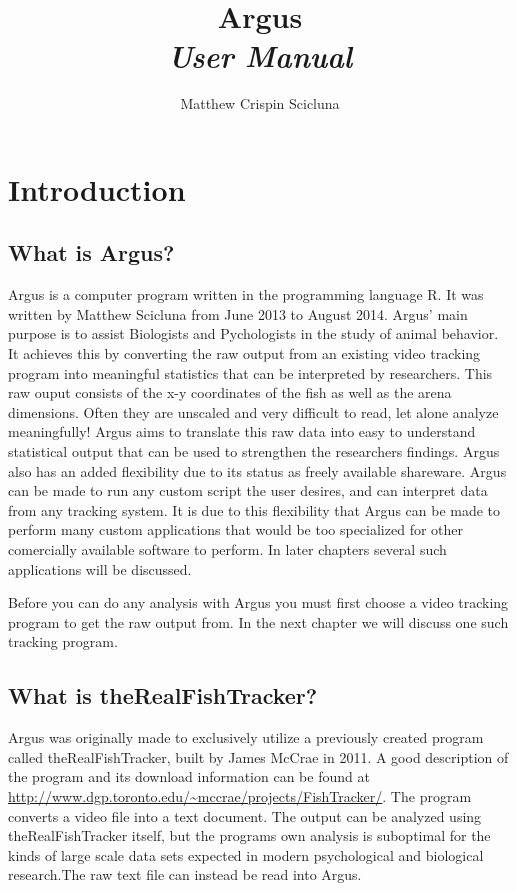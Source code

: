\documentclass[12pt,titlepage]{report}
\begin{document}
\title{\Huge{Argus} 
\\  \large\emph{User Manual}}
\author{Matthew Crispin Scicluna}
\maketitle
\pagebreak
\tableofcontents
\chapter{Introduction}
\section{What is Argus?}
Argus is a computer program written in the programming language R. It was written by Matthew Scicluna from June 2013 to August 2014. Argus' main purpose is to assist Biologists and Pychologists in the study of animal behavior. It achieves this by converting the raw output from an existing video tracking program into meaningful statistics that can be interpreted by researchers. This raw ouput consists of the x-y coordinates of the fish as well as the arena dimensions. Often they are unscaled and very difficult to read, let alone analyze meaningfully! Argus aims to translate this raw data into easy to understand statistical output that can be used to strengthen the researchers findings. Argus also has an added flexibility due to its status as freely available shareware. Argus can be made to run any custom script the user desires, and can interpret data from any tracking system. It is due to this flexibility that Argus can be made to perform many custom applications that would be too specialized for other comercially available software to perform. In later chapters several such applications will be discussed.

Before you can do any analysis with Argus you must first choose a video tracking program to get the raw output from. In the next chapter we will discuss one such tracking program.


\section{What is theRealFishTracker?}
Argus was originally made to exclusively utilize a previously created program called theRealFishTracker, built by James McCrae in 2011. A good description of the program and its download information can be found at \url{http://www.dgp.toronto.edu/~mccrae/projects/FishTracker/}. The program converts a video file into a text document. The output can be analyzed using theRealFishTracker itself, but the programs own analysis is suboptimal for the kinds of large scale data sets expected in modern psychological and biological research.The raw text file can instead be read into Argus.
 
\end{document}
